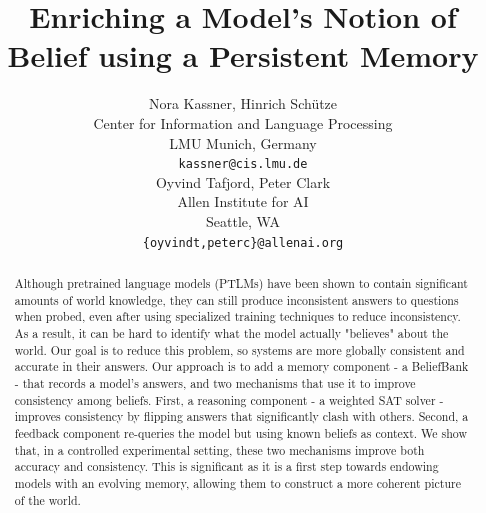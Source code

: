 \documentclass[11pt]{article}
\title{Enriching a Model's Notion of Belief using a Persistent Memory}
\author{Nora Kassner, Hinrich Sch{\"u}tze \\
Center for Information and Language Processing \\
LMU Munich, Germany \\
\texttt{kassner@cis.lmu.de} \\ \And
Oyvind Tafjord, Peter Clark \\
Allen Institute for AI \\
Seattle, WA \\
\texttt{\{oyvindt,peterc\}@allenai.org} \\
}
\newcommand{\nk}[1]{\textcolor{green}{Nora: #1}}
\begin{document}
\maketitle
\begin{abstract}
Although pretrained language models (PTLMs) have been shown to contain significant
amounts of world knowledge, they can still produce inconsistent answers to questions when probed,
even after using specialized training techniques to reduce inconsistency. As a result, it can be
hard to identify what the model actually
"believes" about the world. Our goal is to reduce this problem, so systems are 
more globally consistent and accurate in their answers. Our approach is to add a
memory component - a BeliefBank - that records a model's answers,
and two mechanisms that use it to improve consistency among beliefs. First, a reasoning
component - a weighted SAT solver - improves consistency by flipping
answers that significantly clash with others. Second, a feedback
component re-queries the model but using known beliefs as context.
We show that, in a controlled experimental setting, these two mechanisms
improve both accuracy and consistency. This is significant as it is a
first step towards endowing models with an evolving memory,
allowing them to construct a more coherent picture of the world.
\end{abstract}
\end{document}
